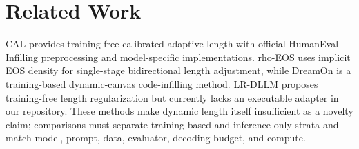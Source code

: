 \section{Related Work}
CAL provides training-free calibrated adaptive length with official HumanEval-Infilling preprocessing and model-specific implementations. rho-EOS uses implicit EOS density for single-stage bidirectional length adjustment, while DreamOn is a training-based dynamic-canvas code-infilling method. LR-DLLM proposes training-free length regularization but currently lacks an executable adapter in our repository. These methods make dynamic length itself insufficient as a novelty claim; comparisons must separate training-based and inference-only strata and match model, prompt, data, evaluator, decoding budget, and compute.
